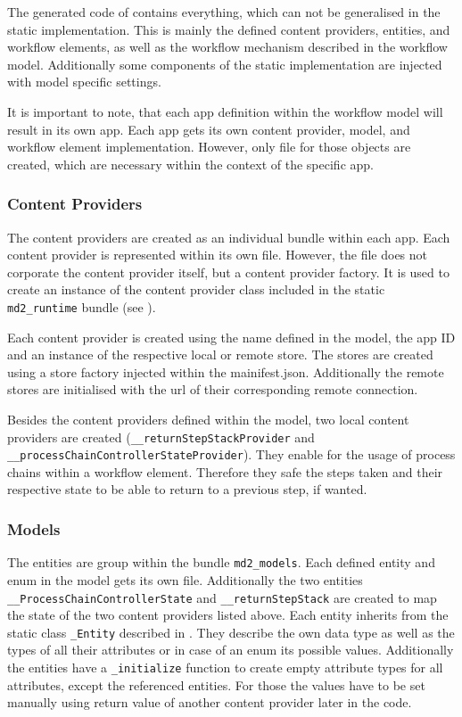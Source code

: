 The generated code of \mapapps contains everything, which can not be generalised in the static implementation. This is mainly the defined content providers, entities, and workflow elements, as well as the workflow mechanism described in the workflow model. Additionally some components of the static \mapapps implementation are injected with model specific settings.

It is important to note, that each app definition within the workflow model will result in its own app. Each app gets its own content provider, model, and workflow element implementation. However, only file for those objects are created, which are necessary within the context of the specific app.

\subsubsection{Content Providers}
The content providers are created as an individual bundle within each app. Each content provider is represented within its own file. However, the file does not corporate the content provider itself, but a content provider factory. It is used to create an instance of the content provider class included in the static \lstinline|md2_runtime| bundle (see ).

Each content provider is created using the name defined in the model, the app ID and an instance of the respective local or remote store. The stores are created using a store factory injected within the mainifest.json.
Additionally the remote stores are initialised with the url of their corresponding remote connection.

Besides the content providers defined within the model, two local content providers are created (\lstinline|__returnStepStackProvider| and \lstinline|__processChainControllerStateProvider|). They enable for the usage of process chains within a workflow element. Therefore they safe the steps taken and their respective state to be able to return to a previous step, if wanted.

\subsubsection{Models}

The entities are group within the bundle \lstinline|md2_models|. Each defined entity and enum in the model gets its own file. Additionally the two entities \lstinline|__ProcessChainControllerState| and \lstinline|__returnStepStack| are created to map the state of the two content providers listed above. Each entity inherits from the static class \lstinline|_Entity| described in . They describe the own data type as well as the types of all their attributes or in case of an enum its possible values. Additionally the entities have a \lstinline|_initialize| function to create empty attribute types for all attributes, except the referenced entities. For those the values have to be set manually using return value of another content provider later in the code.

